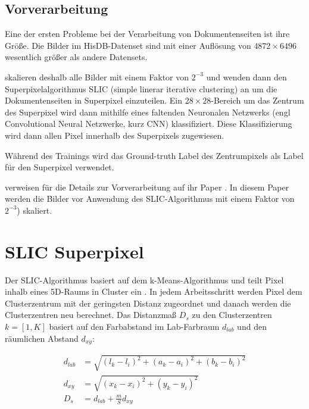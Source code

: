 \subsection{Vorverarbeitung}
Eine der ersten Probleme bei der Verarbeitung von Dokumentenseiten ist ihre Größe.
Die Bilder im HisDB-Datenset sind mit einer Auflösung von \(4872 \times 6496\) wesentlich größer als andere Datensets.

\citeauthor{ChenConvolutionalNeuralNetworks2017} skalieren deshalb alle Bilder mit einem Faktor von  \(2^{-3}\) und wenden dann den Superpixelalgorithmus SLIC (simple linerar iterative clustering) an
\cite{AchantaSLICSuperpixels2010} um die Dokumentenseiten in Superpixel einzuteilen.
Ein \(28 \times 28\)-Bereich um das Zentrum des Superpixel wird dann mithilfe eines faltenden Neuronalen Netzwerks (engl Convolutional Neural Netzwerke, kurz CNN)
klassifiziert. Diese Klassifizierung wird dann allen Pixel innerhalb des Superpixels zugewiesen.

Während des Trainings wird das Ground-truth Label des Zentrumpixels als Label für den Superpixel verwendet.

\citeauthor{ChenConvolutionalNeuralNetworks2017} verweisen für die Details zur Vorverarbeitung 
auf ihr Paper \cite{ChenPageSegmentationHistorical2016}. 
In diesem Paper werden die Bilder vor Anwendung des SLIC-Algorithmus mit einem Faktor von \(2^{-3}\)) skaliert.


\section{SLIC Superpixel}
Der SLIC-Algorithmus basiert auf dem k-Means-Algorithmus und teilt Pixel inhalb eines 5D-Raums in Cluster ein \autocite{AchantaSLICSuperpixels2010}. 
In jedem Arbeitsschritt werden Pixel dem Clusterzentrum mit der geringsten Distanz zugeordnet und danach werden die Clusterzentren neu berechnet.
Das Distanzmaß \(D_s\) zu den Clusterzentren \(k=[1,K]\) basiert auf den Farbabstand im Lab-Farbraum \(d_{lab}\) und den räumlichen Abstand \(d_{xy}\):

\begin{align}
    d_{lab} &= \sqrt{ \left( l_k - l_i \right)^2 + \left( a_k - a_i \right)^2 + \left( b_k - b_i \right)^2 }\\
    d_{xy}  &= \sqrt{ \left( x_k - x_i \right)^2 + \left(y_k - y_i \right)^2 }\\
    D_{s}   &= d_{lab} + \frac{m}{S} d_{xy}
\end{align}




